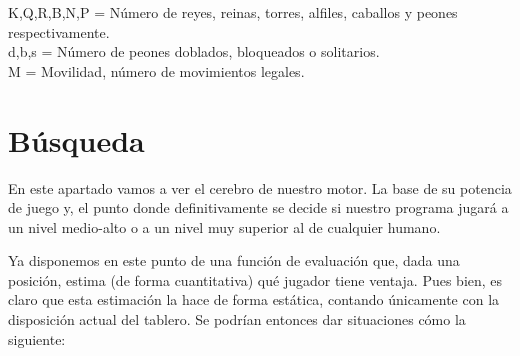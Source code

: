 \documentclass[letterpaper,12pt]{article}
\begin{document}
K,Q,R,B,N,P = Número de reyes, reinas, torres, alfiles, caballos y peones respectivamente. 
\\  d,b,s \hspace{14mm} = Número de peones doblados, bloqueados o solitarios. 
\\ M \hspace{19mm} = Movilidad, número de movimientos legales.


\section{Búsqueda}

En este apartado vamos a ver el cerebro de nuestro motor. La base de su potencia de juego
y, el punto donde definitivamente se decide si nuestro programa jugará a un nivel 
medio-alto o a un nivel muy superior al de cualquier humano.

Ya disponemos en este punto de una función de evaluación que, dada una posición, estima
(de forma cuantitativa) qué jugador tiene ventaja. Pues bien, es claro que esta estimación
la hace de forma estática, contando únicamente con la disposición actual del tablero. Se 
podrían entonces dar situaciones cómo la siguiente:
\setlength{\parskip}{0mm}

    \begin{center}
         \chessboard
         [
            maxfield=h8,
            startfen=a8,
            addfen=6k1/5ppp/PP6/B7/2N1P3/1QN1PbPq/3P1P1P/R4RK1,
            showmover=false
        ]   
    \end{center}
    
\end{document}
